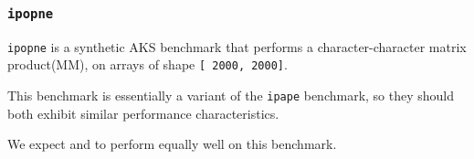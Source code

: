 \subsubsection{\tt ipopne}
\label{benchmarkipopne}

{\tt ipopne} is a synthetic AKS benchmark that performs
a character-character matrix product({\apl M\qor\qdot\qne\qtran\0M}), 
on arrays of shape {\tt [ 2000, 2000]}. 

This benchmark is essentially a variant of the {\tt ipape} benchmark,
so they should both exhibit similar performance characteristics.

We expect \wlf and \awlf to perform equally well on this
benchmark.
